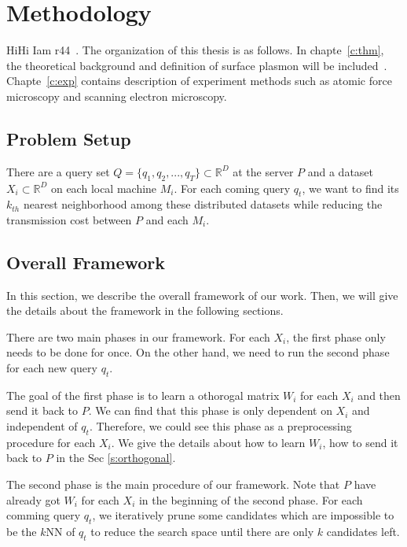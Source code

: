 \chapter{Methodology}
\label{c:method}

HiHi Iam r44~. The organization of this thesis is as follows. In chapte~\ref{c:thm}, the theoretical background and definition of surface plasmon will be included~\cite{maier2007plasmonics}. Chapte~\ref{c:exp} contains description of experiment methods such as atomic force microscopy and scanning electron microscopy. 

\section{Problem Setup}
\label{s:probsetup}
There are a query set $Q={\{q_1,q_2,...,q_T\}}\subset\mathbb{R}^D$ at the server $P$ and a dataset $X_i\subset\mathbb{R}^D$ on each local machine $M_i$.  For each coming query $q_t$, we want to find its $k_{th}$ nearest neighborhood among these distributed datasets while reducing the transmission cost between $P$ and each $M_i$.

\section{Overall Framework}
\label{s:overall}
In this section, we describe the overall framework of our work.  Then, we will give the details about the framework in the following sections.

There are two main phases in our framework.  For each $X_i$, the first phase only needs to be done for once.  On the other hand, we need to run the second phase for each new query $q_t$.

The goal of the first phase is to learn a othorogal matrix $W_i$ for each $X_i$ and then send it back to $P$.  We can find that this phase is only dependent on $X_i$ and independent of $q_t$.  Therefore, we could see this phase as a preprocessing procedure for each $X_i$.  We give the details about how to learn $W_i$, how to send it back to $P$ in the Sec \ref{s:orthogonal}.

The second phase is the main procedure of our framework.  Note that $P$ have already got $W_i$ for each $X_i$ in the beginning of the second phase. For each comming query $q_t$, we iteratively prune some candidates which are impossible to be the $k$NN of $q_t$ to reduce the search space until there are only $k$ candidates left.

